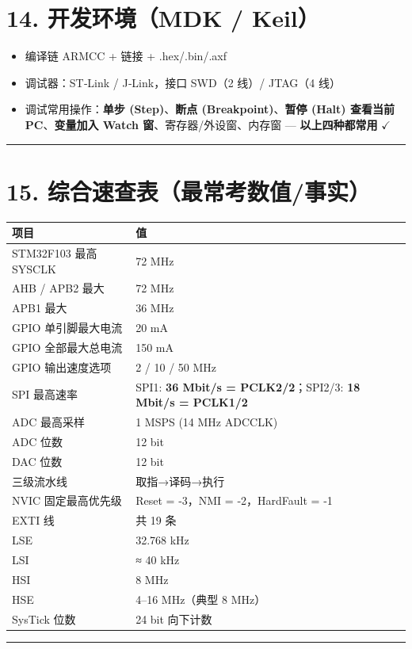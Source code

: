 \documentclass[UTF8,zihao=-5]{ctexart}
\renewcommand{\arraystretch}{0.9}
\newcommand{\okmark}{\ensuremath{\checkmark}}
\begin{document}
\begin{multicols*}{2}
\section*{14. 开发环境（MDK / Keil）}
\begin{itemize}
\item 编译链 ARMCC + 链接 + .hex/.bin/.axf
\item 调试器：ST‑Link / J‑Link，接口 SWD（2 线）/ JTAG（4 线）
\item 调试常用操作：\textbf{单步 (Step)}、\textbf{断点 (Breakpoint)}、\textbf{暂停 (Halt) 查看当前 PC}、\textbf{变量加入 Watch 窗}、寄存器/外设窗、内存窗 — \textbf{以上四种都常用} \okmark
\end{itemize}
\vspace{1pt}\hrule\vspace{1pt}
\section*{15. 综合速查表（最常考数值/事实）}
{\scriptsize\setlength{\tabcolsep}{1.8pt}\renewcommand{\arraystretch}{0.88}%
\begin{tabularx}{\linewidth}{@{}*{2}{Y}@{}}
\toprule
\textbf{项目} & \textbf{值} \\
\midrule
STM32F103 最高 SYSCLK & 72 MHz \\
AHB / APB2 最大 & 72 MHz \\
APB1 最大 & 36 MHz \\
GPIO 单引脚最大电流 & 20 mA \\
GPIO 全部最大总电流 & 150 mA \\
GPIO 输出速度选项 & 2 / 10 / 50 MHz \\
SPI 最高速率 & SPI1: \textbf{36 Mbit/s = PCLK2/2}；SPI2/3: \textbf{18 Mbit/s = PCLK1/2} \\
ADC 最高采样 & 1 MSPS (14 MHz ADCCLK) \\
ADC 位数 & 12 bit \\
DAC 位数 & 12 bit \\
三级流水线 & 取指→译码→执行 \\
NVIC 固定最高优先级 & Reset = ‑3，NMI = ‑2，HardFault = ‑1 \\
EXTI 线 & 共 19 条 \\
LSE & 32.768 kHz \\
LSI & ≈ 40 kHz \\
HSI & 8 MHz \\
HSE & 4–16 MHz（典型 8 MHz） \\
SysTick 位数 & 24 bit 向下计数 \\
\bottomrule
\end{tabularx}}
\vspace{1pt}\hrule\vspace{1pt}

\end{multicols*}
\end{document}
